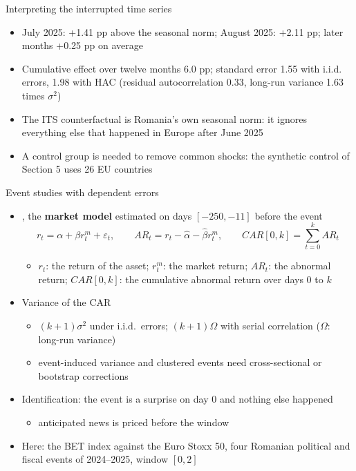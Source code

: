 \begin{frame}{Interpreting the interrupted time series}
\itemsize{\small}
\begin{itemize}
    \item July 2025: +1.41 pp above the seasonal norm; August 2025: +2.11 pp; later months +0.25 pp on average
    \item Cumulative effect over twelve months 6.0 pp; standard error 1.55 with i.i.d. errors, 1.98 with HAC (residual autocorrelation 0.33, long-run variance 1.63 times $\sigma^2$)
    \item The ITS counterfactual is Romania's own seasonal norm: it ignores everything else that happened in Europe after June 2025
    \item A control group is needed to remove common shocks: the synthetic control of Section 5 uses 26 EU countries
\end{itemize}
\end{frame}

\begin{frame}{Event studies with dependent errors}
\itemsize{\small}
\begin{itemize}
    \item {}, the \textbf{market model} estimated on days $[-250, -11]$ before the event \[ r_t = \alpha + \beta r^m_t + \varepsilon_t, \qquad AR_t = r_t - \hat\alpha - \hat\beta r^m_t, \qquad CAR[0, k] = \sum_{t=0}^k AR_t \]
    \begin{itemize}
        \item $r_t$: the return of the asset; $r^m_t$: the market return; $AR_t$: the abnormal return; $CAR[0, k]$: the cumulative abnormal return over days 0 to $k$
    \end{itemize}
    \item Variance of the CAR
    \begin{itemize}
        \item $(k + 1)\sigma^2$ under i.i.d.\ errors; $(k + 1)\Omega$ with serial correlation ($\Omega$: long-run variance)
        \item event-induced variance and clustered events need cross-sectional or bootstrap corrections
    \end{itemize}
    \item Identification: the event is a surprise on day 0 and nothing else happened
    \begin{itemize}
        \item anticipated news is priced before the window
    \end{itemize}
    \item Here: the BET index against the Euro Stoxx 50, four Romanian political and fiscal events of 2024--2025, window $[0, 2]$
\end{itemize}
\end{frame}

